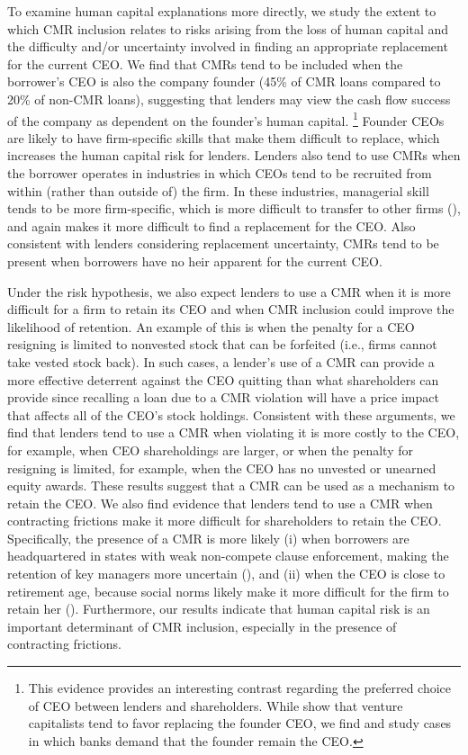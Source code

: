 \documentclass[a4paper,12pt]{article}
\begin{document}
To examine human capital explanations more directly, we study the extent to which CMR inclusion relates to risks arising from the loss of human capital and the difficulty and/or uncertainty involved in finding an appropriate replacement for the current CEO.
We find that CMRs tend to be included when the borrower's CEO is also the company founder (45\% of CMR loans compared to 20\% of non-CMR loans),
suggesting that lenders may view the cash flow success of the company as dependent on the founder's human capital.%
  \footnote{This evidence provides an interesting contrast regarding the preferred choice of CEO between lenders and shareholders. While \citet{Kaplan_2009} show that venture capitalists tend to favor replacing the founder CEO, we find and study cases in which banks demand that the founder remain the CEO.}
Founder CEOs are likely to have firm-specific skills that make them difficult to replace, which increases the human capital risk for lenders.
Lenders also tend to use CMRs when the borrower operates in industries in which CEOs tend to be recruited from within (rather than outside of) the firm.
In these industries, managerial skill tends to be more firm-specific, which is more difficult to transfer to other firms (\citet{Cremers_2014}), and again makes it more difficult to find a replacement for the CEO.
Also consistent with lenders considering replacement uncertainty, CMRs tend to be present when borrowers have no heir apparent for the current CEO.



Under the risk hypothesis, we also expect lenders to use a CMR when it is more difficult for a firm to retain its CEO and when CMR inclusion could improve the likelihood of retention.
An example of this is when the penalty for a CEO resigning is limited to nonvested stock that can be forfeited (i.e., firms cannot take vested stock back).
In such cases, a lender's use of a CMR can provide a more effective deterrent against the CEO quitting than what shareholders can provide since recalling a loan due to a CMR violation will have a price impact that affects all of the CEO's stock holdings.
Consistent with these arguments, we find that lenders tend to use a CMR when violating it is more costly to the CEO, for example, when CEO shareholdings are larger, or when the penalty for resigning is limited, for example, when the CEO has no unvested or unearned equity awards.
These results suggest that a CMR can be used as a mechanism to retain the CEO.
We also find evidence that lenders tend to use a CMR when contracting frictions make it more difficult for shareholders to retain the CEO.
Specifically, the presence of a CMR is more likely (i) when borrowers are headquartered in states with weak non-compete clause enforcement, making the retention of key managers more uncertain (\citet{Garmaise_2011}), and (ii) when the CEO is close to retirement age, because social norms likely make it more difficult for the firm to retain her (\citet{Jenter_2015a}).
Furthermore, our results indicate that human capital risk is an important determinant of CMR inclusion, especially in the presence of contracting frictions.
\end{document}
